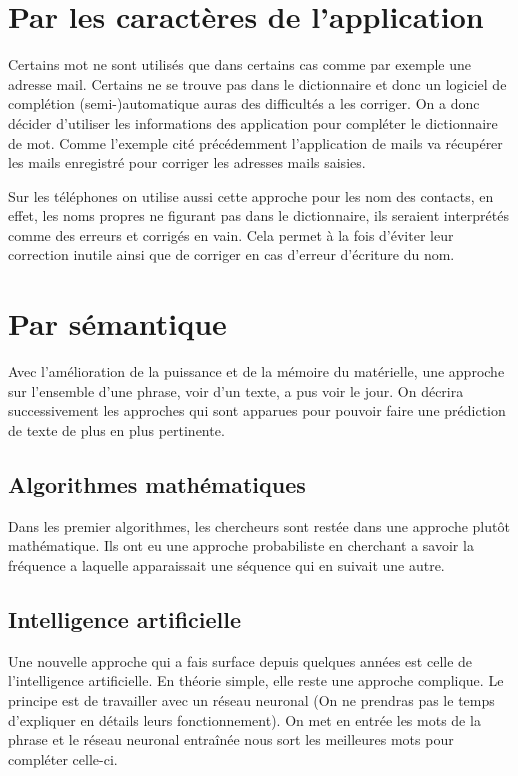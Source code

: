 \documentclass[final, 10pt]{report}
\begin{document}
\section{Par les caractères de l'application}

    Certains mot ne sont utilisés que dans certains cas comme par exemple une adresse mail.
    Certains ne se trouve pas dans le dictionnaire et donc un logiciel de complétion (semi-)automatique auras des difficultés a les corriger.
    On a donc décider d'utiliser les informations des application pour compléter le dictionnaire de mot.
    Comme l'exemple cité précédemment l'application de mails va récupérer les mails enregistré pour corriger les adresses mails saisies.
    
    Sur les téléphones on utilise aussi cette approche pour les nom des contacts, en effet, les noms propres ne figurant pas dans le dictionnaire, ils seraient interprétés comme des erreurs et corrigés en vain. Cela permet à la fois d'éviter leur correction inutile ainsi que de corriger en cas d'erreur d'écriture du nom.

\section{Par sémantique}

    Avec l'amélioration de la puissance et de la mémoire du matérielle, une approche sur l'ensemble d'une phrase, voir d'un texte, a pus voir le jour.
    On décrira successivement les approches qui sont apparues pour pouvoir faire une prédiction de texte de plus en plus pertinente.
    
    \subsection{Algorithmes mathématiques}
    
        Dans les premier algorithmes, les chercheurs sont restée dans une approche plutôt mathématique.
        Ils ont eu une approche probabiliste en cherchant a savoir la fréquence a laquelle apparaissait une séquence qui en suivait une autre.
        
    
    \subsection{Intelligence artificielle}
    
        Une nouvelle approche qui a fais surface depuis quelques années est celle de l'intelligence artificielle.
        En théorie simple, elle reste une approche complique.
        Le principe est de travailler avec un réseau neuronal (On ne prendras pas le temps d'expliquer en détails leurs fonctionnement).
        On met en entrée les mots de la phrase et le réseau neuronal entraînée nous sort les meilleures mots pour compléter celle-ci.
        
\end{document}
